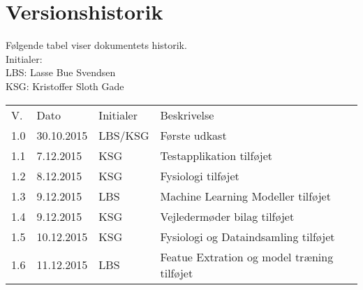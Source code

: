 \documentclass[pdftex, 11pt, a4paper, twoside, danish]{memoir}
\begin{document}
    
    
    
    \bgroup
	    \hypersetup{linkcolor=black}
	    \tableofcontents*	%
    \egroup
    \section*{Versionshistorik}
    Følgende tabel viser dokumentets historik.\\    
    Initialer:\\
    LBS: Lasse Bue Svendsen\\
    KSG: Kristoffer Sloth Gade
    \bgroup
    \def\arraystretch{1.8}
    \begin{center}
    	\begin{tabular}{lllp{206pt}}
    		\rowcolor{grey} V.	& Dato 		& Initialer & Beskrivelse \\
    		1.0	& 30.10.2015 	& LBS/KSG	& Første udkast\\
    		1.1	& 7.12.2015 	& KSG		& Testapplikation tilføjet\\
    		1.2 & 8.12.2015		& KSG		& Fysiologi tilføjet\\
    		1.3	& 9.12.2015		& LBS		& Machine Learning Modeller tilføjet\\
    		1.4 & 9.12.2015		& KSG		& Vejledermøder bilag tilføjet\\
    		1.5 & 10.12.2015	& KSG		& Fysiologi og Dataindsamling tilføjet\\
    		1.6 & 11.12.2015	& LBS		& Featue Extration og model træning tilføjet
    	\end{tabular}
    \end{center}
    \egroup
    
    
    
    
    
    
    
    
    
    
    
    
    
    
    
        
    
    
    
    


    
    \listoftodos
\end{document}
